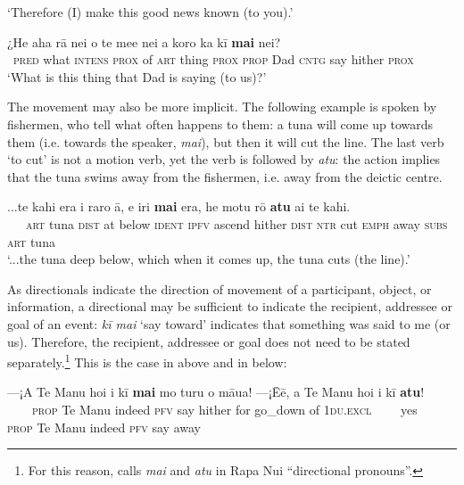 \glt 
‘Therefore (I) make this good news known (to you).’ \textstyleExampleref{[Acts 13:32]}
\z

\ea\label{ex:7.128}
\gll ¿He aha rā nei o te me{\ꞌ}e nei a koro ka kī \textbf{mai} nei? \\
~\textsc{pred} what \textsc{intens} \textsc{prox} of \textsc{art} thing \textsc{prox} \textsc{prop} Dad \textsc{cntg} say hither \textsc{prox} \\

\glt
‘What is this thing that Dad is saying (to us)?’ \textstyleExampleref{[R313.007]} 
\z

The movement may also be more implicit. The following example is spoken by fishermen, who tell what often happens to them: a tuna will come up towards them (i.e. towards the speaker, \textit{mai}), but then it will cut the line. The last verb ‘to cut’ is not a motion verb, yet the verb is followed by \textit{atu}: the action implies that the tuna swims away from the fishermen, i.e. away from the deictic centre.

\ea\label{ex:7.129}
\gll ...te kahi era {\ꞌ}i raro {\ꞌ}ā, e iri \textbf{mai} era,  he motu rō \textbf{atu} {\ꞌ}ai te kahi.\\
~~~\textsc{art} tuna \textsc{dist} at below \textsc{ident} \textsc{ipfv} ascend hither \textsc{dist}  \textsc{ntr} cut \textsc{emph} away \textsc{subs} \textsc{art} tuna\\

\glt 
‘...the tuna deep below, which when it comes up, the tuna cuts (the line).’ \textstyleExampleref{[R368.024]} 
\z

As directionals indicate the direction of movement of a participant, object, or information, a directional may be sufficient to indicate the recipient, addressee or goal of an event: \textit{kī mai} ‘say toward’ indicates that something was said to me (or us). Therefore, the recipient, addressee or goal does not need to be stated separately.\footnote{\label{fn:351}For this reason, \citet[4]{Wittenstein1978} calls \textit{mai} and \textit{atu} in Rapa Nui “directional pronouns”.} This is the case in  above and in  below:

\ea\label{ex:7.130}
\gll —¡A Te Manu ho{\ꞌ}i i kī \textbf{mai} mo turu o māua!  —¡{\ꞌ}Ēē, a Te Manu ho{\ꞌ}i i kī \textbf{atu}!\\
~~~~\textsc{prop} Te Manu indeed  \textsc{pfv} say hither for go\_down of \textsc{1du.excl}  ~~~~yes~~ \textsc{prop} Te Manu indeed \textsc{pfv} say away\\

